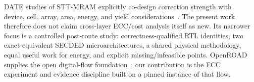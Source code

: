 DATE studies of STT-MRAM explicitly co-design correction strength with device, cell, array, area, energy, and yield considerations~\cite{delbel2014,pajouhi2015}. The present work therefore does not claim cross-layer ECC/cost analysis itself as new. Its narrower focus is a controlled post-route study: correctness-qualified RTL identities, two exact-equivalent SECDED microarchitectures, a shared physical methodology, equal useful work for energy, and explicit missing/infeasible points. OpenROAD supplies the open digital-flow foundation~\cite{ajayi2019}; our contribution is the ECC experiment and evidence discipline built on a pinned instance of that flow.

